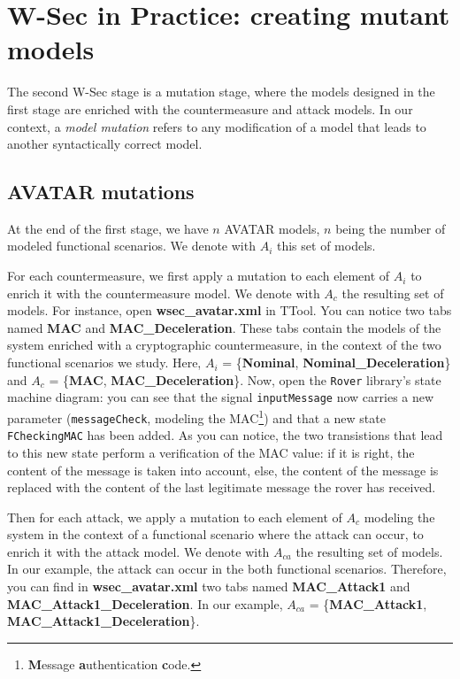 \documentclass{article}
\begin{document}
\section{W-Sec in Practice: creating mutant models}

The second W-Sec stage is a mutation stage, where the models designed in the first stage are enriched with the countermeasure and attack models. In our context, a \emph{model mutation} refers to any modification of a model that leads to another syntactically correct model.

\subsection{AVATAR mutations}

At the end of the first stage, we have $n$ AVATAR models, $n$ being the number of modeled functional scenarios. We denote with $A_i$ this set of models.

For each countermeasure, we first apply a mutation to each element of $A_i$ to enrich it with the countermeasure model. We denote with $A_c$ the resulting set of models. For instance, open \textbf{wsec\_avatar.xml} in TTool. You can notice two tabs named \textbf{MAC} and \textbf{MAC\_Deceleration}. These tabs contain the models of the system enriched with a cryptographic countermeasure, in the context of the two functional scenarios we study. Here, $A_i$ = \{\textbf{Nominal}, \textbf{Nominal\_Deceleration}\} and $A_c$ = \{\textbf{MAC}, \textbf{MAC\_Deceleration}\}. Now, open the \texttt{Rover} library's state machine diagram: you can see that the signal \texttt{inputMessage} now carries a new parameter (\texttt{messageCheck}, modeling the MAC\footnote{\textbf{M}essage \textbf{a}uthentication \textbf{c}ode.}) and that a new state \texttt{FCheckingMAC} has been added. As you can notice, the two transistions that lead to this new state perform a verification of the MAC value: if it is right, the content of the message is taken into account, else, the content of the message is replaced with the content of the last legitimate message the rover has received.

Then for each attack, we apply a mutation to each element of $A_c$ modeling the system in the context of a functional scenario where the attack can occur, to enrich it with the attack model. We denote with $A_{c a}$ the resulting set of models. In our example, the attack can occur in the both functional scenarios. Therefore, you can find in \textbf{wsec\_avatar.xml} two tabs named \textbf{MAC\_Attack1} and \textbf{MAC\_Attack1\_Deceleration}. In our example, $A_{c a}$ = \{\textbf{MAC\_Attack1}, \textbf{MAC\_Attack1\_Deceleration}\}.
\end{document}
